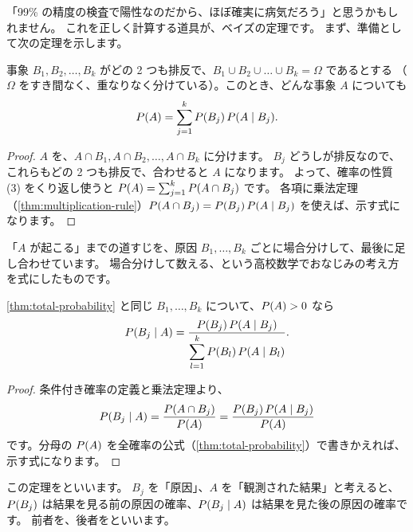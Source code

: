 「99\% の精度の検査で陽性なのだから、ほぼ確実に病気だろう」と思うかもしれません。
これを正しく計算する道具が、ベイズの定理です。
まず、準備として次の定理を示します。

\begin{theorem}
  事象 $B_1, B_2, \dots, B_k$ がどの 2 つも排反で、$B_1 \cup B_2 \cup \dots \cup B_k = \Omega$ であるとする
  （$\Omega$ をすき間なく、重なりなく分けている）。このとき、どんな事象 $A$ についても
  \[
    P(A) = \sum_{j=1}^{k} P(B_j)\, P(A \mid B_j).
  \]
\end{theorem}

\begin{proof}
  $A$ を、$A \cap B_1, A \cap B_2, \dots, A \cap B_k$ に分けます。
  $B_j$ どうしが排反なので、これらもどの 2 つも排反で、合わせると $A$ になります。
  よって、確率の性質 (3) をくり返し使うと
  $P(A) = \sum_{j=1}^{k} P(A \cap B_j)$ です。
  各項に乗法定理（\cref{thm:multiplication-rule}）$P(A \cap B_j) = P(B_j)\,P(A \mid B_j)$ を使えば、示す式になります。
\end{proof}

\begin{intuition}
  「$A$ が起こる」までの道すじを、原因 $B_1, \dots, B_k$ ごとに場合分けして、最後に足し合わせています。
  場合分けして数える、という高校数学でおなじみの考え方を式にしたものです。
\end{intuition}

\begin{theorem}
  \cref{thm:total-probability} と同じ $B_1, \dots, B_k$ について、$P(A) > 0$ なら
  \[
    P(B_j \mid A) = \frac{P(B_j)\, P(A \mid B_j)}{\displaystyle\sum_{l=1}^{k} P(B_l)\, P(A \mid B_l)}.
  \]
\end{theorem}

\begin{proof}
  条件付き確率の定義と乗法定理より、
  \[
    P(B_j \mid A) = \frac{P(A \cap B_j)}{P(A)} = \frac{P(B_j)\, P(A \mid B_j)}{P(A)}
  \]
  です。分母の $P(A)$ を全確率の公式（\cref{thm:total-probability}）で書きかえれば、示す式になります。
\end{proof}

この定理をといいます。
$B_j$ を「原因」、$A$ を「観測された結果」と考えると、
$P(B_j)$ は結果を見る前の原因の確率、$P(B_j \mid A)$ は結果を見た後の原因の確率です。
前者を、後者をといいます。


